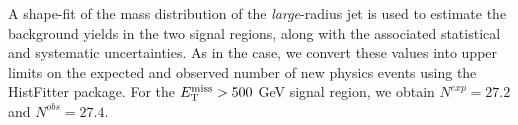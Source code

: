 
A shape-fit of the mass distribution of the \textit{large}-radius jet is used to estimate the background yields in the two signal regions, along with the associated statistical and systematic uncertainties. As in the \monoZ case, we convert these values into upper limits on the expected and observed number of new physics events using the HistFitter package. For the $E_{\mathrm{T}}^{\mathrm{miss}} > 500$ GeV signal region, we obtain $N^{exp} = 27.2$ and $N^{obs} = 27.4$.
